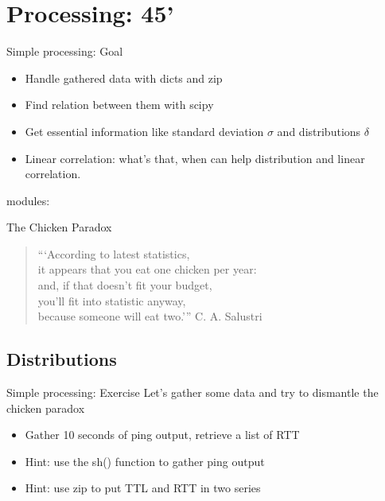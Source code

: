 \section{Processing: 45'}

\begin{frame}[fragile]{Simple processing: Goal}
\begin{itemize}
\item Handle gathered data with dicts and zip
\item Find relation between them with scipy
\item Get essential information like standard deviation $\sigma$ and distributions $\delta$
\item Linear correlation: what's that, when can help
distribution and linear correlation.
\end{itemize}
modules: 
\end{frame}


\begin{frame}[fragile]{The Chicken Paradox}
\begin{verse}
```According to latest statistics, \\
it appears that you eat one chicken per year: \\
and, if that doesn't fit your budget,\\
you'll fit into statistic anyway,\\
because someone will eat two.'''
\hfill C. A. Salustri
\end{verse}
\end{frame}

\subsection{Distributions}
\begin{frame}[fragile]{Simple processing: Exercise}
Let's gather some data and try to dismantle the chicken paradox
\begin{itemize}
\item Gather 10 seconds of ping output, retrieve a list of RTT
\item Hint: use the sh() function to gather ping output
\item Hint: use zip to put TTL and RTT in two series
\end{itemize}
\end{frame}

